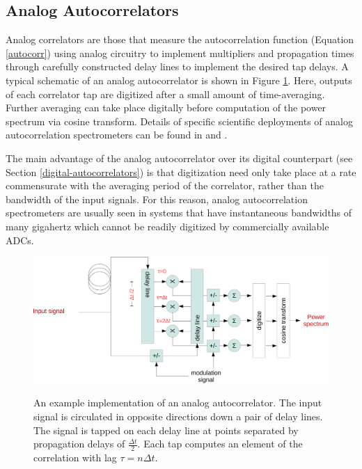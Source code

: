 \documentclass{article}
\begin{document}
\subsection{Analog Autocorrelators}\label{analog-autocorrelators}

Analog correlators are those that measure the autocorrelation function (Equation \ref{autocorr}) using analog circuitry to implement multipliers and propagation times through carefully constructed delay lines to implement the desired tap delays.
A typical schematic of an analog autocorrelator is shown in Figure \ref{fig:analog-autocorr}. Here, outputs of each correlator tap are digitized after a small amount of time-averaging. Further averaging can take place digitally before computation of the power spectrum via cosine transform. Details of specific scientific deployments of analog autocorrelation spectrometers can be found in \cite{Erickson2007} and \cite{Harris1998}.

The main advantage of the analog autocorrelator over its digital counterpart (see Section \ref{digital-autocorrelators}) is that digitization need only take place at a rate commensurate with the averaging period of the correlator, rather than the bandwidth of the input signals. For this reason, analog autocorrelation spectrometers are usually seen in systems that have instantaneous bandwidths of many gigahertz which cannot be readily digitized by commercially available ADCs.


\begin{figure}
 \centering
 \includegraphics[width=\textwidth]{./figures/analog-autocorr-crop.pdf}
 \label{fig:analog-autocorr}
 \caption{An example implementation of an analog autocorrelator. The input signal is circulated in opposite directions down a pair of delay lines. The signal is tapped on each delay line at points separated by propagation delays of $\frac{\Delta t}{2}$. Each tap computes an element of the correlation with lag $\tau=n\Delta t$.}
\end{figure}
\end{document}
